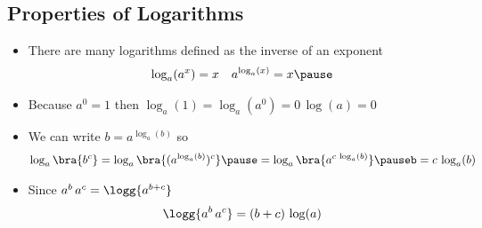 \begin{slide}
\section{Properties of Logarithms}

\begin{PauseHighLight}
  \begin{itemize}
  \item There are many logarithms defined as the inverse of an exponent
    \begin{align*}
      \log_a(a^x) &=x & a^{\log_a(x)}= x \pause
    \end{align*}
  \item Because $a^0 =1$ then $\log_a(1)= \log_a(a^0) = 0\,\log(a)=
    0$\pause
  \item We can write $b = a^{\log_a(b)}$ so
    \begin{align*}
      \log_a\bra{b^c} = \log_a\bra{(a^{\log_a(b)})^c}\pause =
      \log_a\bra{a^{c\,\log_a(b)}}\pauseb = c\,\log_a(b)
    \end{align*}
  \item Since $a^b \, a^c= \logg{a^{b+c}}$
    \begin{align*}
      \logg{a^b \, a^c} = (b+c)\,\log(a)
    \end{align*}
  \end{itemize}
\end{PauseHighLight}


\end{slide}



